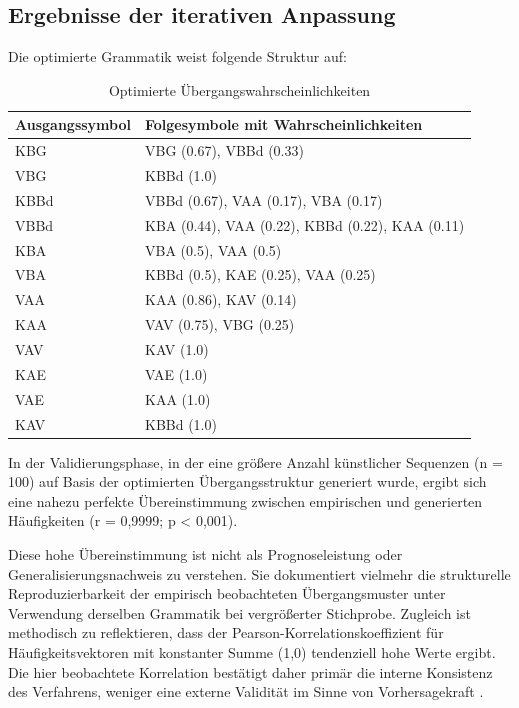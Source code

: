 \documentclass[
  12pt,
  a4paper,
  oneside,
  titlepage
]{article}
\begin{document}
\subsection{Ergebnisse der iterativen Anpassung}

Die optimierte Grammatik weist folgende Struktur auf:

\begin{table}[h]
\centering
\caption{Optimierte Übergangswahrscheinlichkeiten}
\label{tab:ergebnisse}
\begin{tabular}{@{} l l @{}}
\toprule
\textbf{Ausgangssymbol} & \textbf{Folgesymbole mit Wahrscheinlichkeiten} \\
\midrule
KBG & VBG (0.67), VBBd (0.33) \\
VBG & KBBd (1.0) \\
KBBd & VBBd (0.67), VAA (0.17), VBA (0.17) \\
VBBd & KBA (0.44), VAA (0.22), KBBd (0.22), KAA (0.11) \\
KBA & VBA (0.5), VAA (0.5) \\
VBA & KBBd (0.5), KAE (0.25), VAA (0.25) \\
VAA & KAA (0.86), KAV (0.14) \\
KAA & VAV (0.75), VBG (0.25) \\
VAV & KAV (1.0) \\
KAE & VAE (1.0) \\
VAE & KAA (1.0) \\
KAV & KBBd (1.0) \\
\bottomrule
\end{tabular}
\end{table}

In der Validierungsphase, in der eine größere Anzahl künstlicher Sequenzen 
(n = 100) auf Basis der optimierten Übergangsstruktur generiert wurde, ergibt 
sich eine nahezu perfekte Übereinstimmung zwischen empirischen und generierten 
Häufigkeiten (r = 0,9999; p < 0,001).

Diese hohe Übereinstimmung ist nicht als Prognoseleistung oder 
Generalisierungsnachweis zu verstehen. Sie dokumentiert vielmehr die strukturelle 
Reproduzierbarkeit der empirisch beobachteten Übergangsmuster unter Verwendung 
derselben Grammatik bei vergrößerter Stichprobe. Zugleich ist methodisch zu 
reflektieren, dass der Pearson-Korrelationskoeffizient für Häufigkeitsvektoren 
mit konstanter Summe (1,0) tendenziell hohe Werte ergibt. Die hier beobachtete 
Korrelation bestätigt daher primär die interne Konsistenz des Verfahrens, 
weniger eine externe Validität im Sinne von Vorhersagekraft \citep[ S.~489]{Flick2019}.
\end{document}
